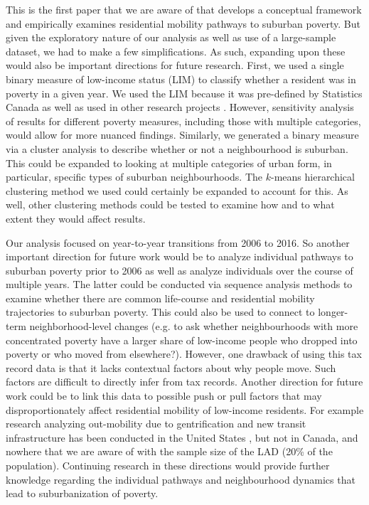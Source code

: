 This is the first paper that we are aware of that develops a conceptual framework and empirically examines residential mobility pathways to suburban poverty. But given the exploratory nature of our analysis as well as use of a large-sample dataset, we had to make a few simplifications. As such, expanding upon these would also be important directions for future research. First, we used a single binary measure of low-income status (LIM) to classify whether a resident was in poverty in a given year. We used the LIM because it was pre-defined by Statistics Canada as well as used in other research projects \cite{picot_immigration_2014,allen_sizing_2019,brown_money_2019}. However, sensitivity analysis of results for different poverty measures, including those with multiple categories, would allow for more nuanced findings. Similarly, we generated a binary measure via a cluster analysis to describe whether or not a neighbourhood is suburban. This could be expanded to looking at multiple categories of urban form, in particular, specific types of suburban neighbourhoods. The $k$-means hierarchical clustering method we used could certainly be expanded to account for this. As well, other clustering methods could be tested to examine how and to what extent they would affect results.

Our analysis focused on year-to-year transitions from 2006 to 2016. So another important direction for future work would be to analyze individual pathways to suburban poverty prior to 2006 as well as analyze individuals over the course of multiple years. The latter could be conducted via sequence analysis methods to examine whether there are common life-course and residential mobility trajectories to suburban poverty. This could also be used to connect to longer-term neighborhood-level changes (e.g. to ask whether neighbourhoods with more concentrated poverty have a larger share of low-income people who dropped into poverty or who moved from elsewhere?). However, one drawback of using this tax record data is that it lacks contextual factors about why people move. Such factors are difficult to directly infer from tax records. Another direction for future work could be to link this data to possible push or pull factors that may disproportionately affect residential mobility of low-income residents. For example research analyzing out-mobility due to gentrification and new transit infrastructure has been conducted in the United States \cite{freeman_displacement_2005,delmelle_new_2020}, but not in Canada, and nowhere that we are aware of with the sample size of the LAD (20\% of the population). Continuing research in these directions would provide further knowledge regarding the individual pathways and neighbourhood dynamics that lead to suburbanization of poverty.



